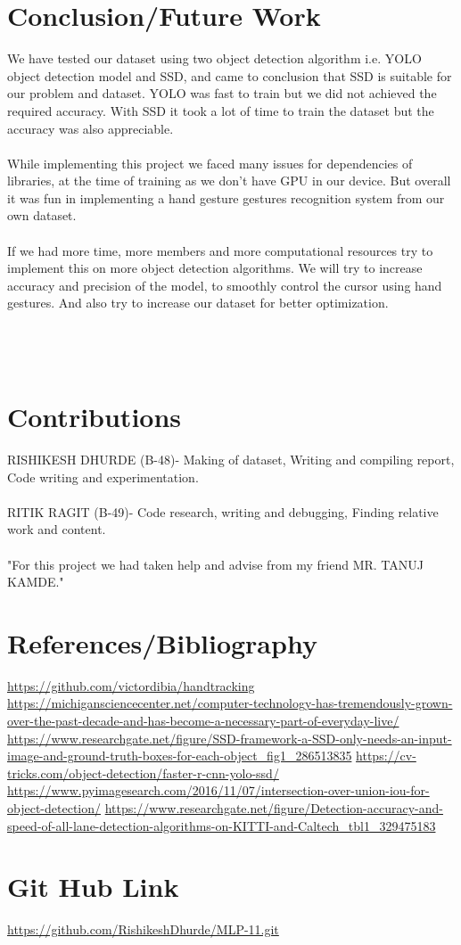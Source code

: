 \documentclass[12pt]{article}
\begin{document}
\section{Conclusion/Future Work}
We have tested our dataset using two object detection algorithm i.e. YOLO object detection model and SSD, and came to conclusion that SSD is suitable for our problem and dataset. YOLO was fast to train but we did not achieved the required accuracy. With SSD it took a lot of time to train the dataset but the accuracy was also appreciable.\\
\\
While implementing this project we faced many issues for dependencies of libraries, at the time of training as we don't have GPU in our device. But overall it was fun in implementing a hand gesture gestures recognition system from our own dataset.\\
\\
If we had more time, more members and more computational resources try to implement this on more object detection algorithms. We will try to increase accuracy and precision of the model, to smoothly control the cursor using hand gestures. And also try to increase our dataset for better optimization.
\\
\\
\\
\\
\section{Contributions}
RISHIKESH DHURDE (B-48)- Making of dataset, Writing and compiling report, Code writing and experimentation.\\
\\
RITIK RAGIT (B-49)- Code research, writing and debugging, Finding relative work and content.\\
\\
"For this project we had taken help and advise from my friend MR. TANUJ KAMDE."


\section{References/Bibliography}
\begin{thebibliography}{99}

\url{https://github.com/victordibia/handtracking}
\url{https://michigansciencecenter.net/computer-technology-has-tremendously-grown-over-the-past-decade-and-has-become-a-necessary-part-of-everyday-live/}
\url{https://www.researchgate.net/figure/SSD-framework-a-SSD-only-needs-an-input-image-and-ground-truth-boxes-for-each-object_fig1_286513835}
\url{https://cv-tricks.com/object-detection/faster-r-cnn-yolo-ssd/}
\url{https://www.pyimagesearch.com/2016/11/07/intersection-over-union-iou-for-object-detection/}
\url{https://www.researchgate.net/figure/Detection-accuracy-and-speed-of-all-lane-detection-algorithms-on-KITTI-and-Caltech_tbl1_329475183}
\end{thebibliography}
\section{Git Hub Link}
\url{https://github.com/RishikeshDhurde/MLP-11.git}
\end{document}
